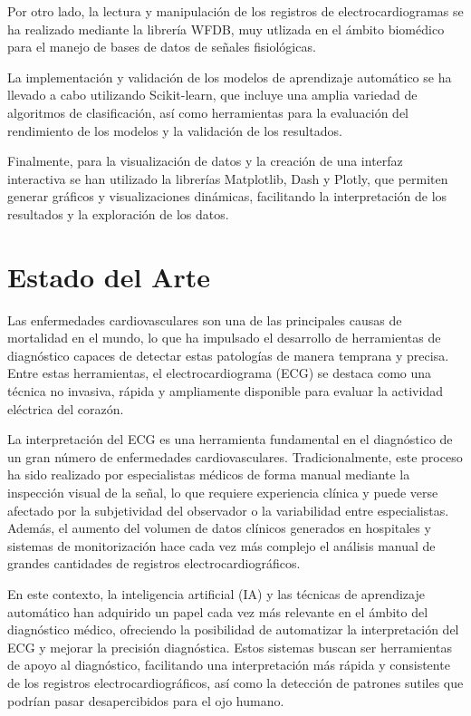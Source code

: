\documentclass[12pt,a4paper,twoside]{book}
\begin{document}
Por otro lado, la lectura y manipulación de los registros de electrocardiogramas se ha realizado mediante la librería WFDB, muy utlizada en el ámbito biomédico para el manejo de bases de datos de señales fisiológicas.

La implementación y validación de los modelos de aprendizaje automático se ha llevado a cabo utilizando Scikit-learn, que incluye una amplia variedad de algoritmos de clasificación, así como herramientas para la evaluación del rendimiento de los modelos y la validación de los resultados.

Finalmente, para la visualización de datos y la creación de una interfaz interactiva se han utilizado la librerías Matplotlib, Dash y Plotly, que permiten generar gráficos y visualizaciones dinámicas, facilitando la interpretación de los resultados y la exploración de los datos.


\chapter{Estado del Arte}

Las enfermedades cardiovasculares son una de las principales causas de mortalidad en el mundo, lo que ha impulsado el desarrollo de herramientas de diagnóstico capaces de detectar estas patologías de manera temprana y precisa.
Entre estas herramientas, el electrocardiograma (ECG) se destaca como una técnica no invasiva, rápida y ampliamente disponible para evaluar la actividad eléctrica del corazón.

La interpretación del ECG es una herramienta fundamental en el diagnóstico de un gran número de enfermedades cardiovasculares. 
Tradicionalmente, este proceso ha sido realizado por especialistas médicos de forma manual mediante la inspección visual de la señal, lo que requiere experiencia clínica y puede verse afectado por la subjetividad del observador o la variabilidad entre especialistas.
Además, el aumento del volumen de datos clínicos generados en hospitales y sistemas de monitorización hace cada vez más complejo el análisis manual de grandes cantidades de registros electrocardiográficos.

En este contexto, la inteligencia artificial (IA) y las técnicas de aprendizaje automático han adquirido un papel cada vez más relevante en el ámbito del diagnóstico médico, ofreciendo la posibilidad de automatizar la interpretación del ECG y mejorar la precisión diagnóstica.
Estos sistemas buscan ser herramientas de apoyo al diagnóstico, facilitando una interpretación más rápida y consistente de los registros electrocardiográficos, así como la detección de patrones sutiles que podrían pasar desapercibidos para el ojo humano.
\end{document}
